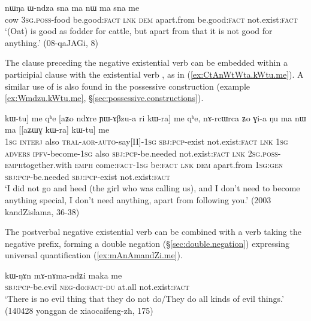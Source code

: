 \begin{exe}
\ex \label{ex:sna.me} 
\gll nɯŋa ɯ-ndza sna ma nɯ ma sna me \\
cow \textsc{3sg}.\textsc{poss}-food be.good:\textsc{fact} \textsc{lnk} \textsc{dem} apart.from be.good:\textsc{fact} not.exist:\textsc{fact} \\
\glt `(Oat) is good as fodder for cattle, but apart from that it is not good for anything.' (08-qaJAGi, 8)
\end{exe}

The clause preceding the negative existential verb can be embedded within a participial clause with the existential verb , as in (\ref{ex:CtAnWtWta.kWtu.me}). A similar use of  is also found in the possessive construction (example \ref{ex:Wmdzu.kWtu.me}, §\ref{sec:possessive.constructions}).

\begin{exe}
\ex \label{ex:CtAnWtWta.kWtu.me} 
\gll [[aʑo joβ tɕi ɕ-tɤ-nɯ-tɯt-a] kɯ-tu] me qʰe  [aʑo ndɤre ɲɯ-ɤβzu-a ri kɯ-ra] me qʰe, nɤ-rcɯ\redp{}rca ʑo ɣi-a ŋu ma nɯ ma [[aʑɯɣ kɯ-ra] kɯ-tu] me \\
\textsc{1sg} \textsc{interj} also \textsc{tral}-\textsc{aor}-\textsc{auto}-say[II]-\textsc{1sg} \textsc{sbj}:\textsc{pcp}-exist not.exist:\textsc{fact} \textsc{lnk} \textsc{1sg} \textsc{advers} \textsc{ipfv}-become-\textsc{1sg} also \textsc{sbj}:\textsc{pcp}-be.needed not.exist:\textsc{fact} \textsc{lnk} \textsc{2sg}.\textsc{poss}-\textsc{emph}\redp{}together.with \textsc{emph} come:\textsc{fact}-\textsc{1sg} be:\textsc{fact} \textsc{lnk} \textsc{dem} apart.from \textsc{1sg}:\textsc{gen} \textsc{sbj}:\textsc{pcp}-be.needed \textsc{sbj}:\textsc{pcp}-exist not.exist:\textsc{fact} \\
\glt `I did not go and heed (the girl who was calling us), and I don't need to become anything special, I don't need anything, apart from following you.' (2003 kandZislama, 36-38)
\end{exe}

The postverbal negative existential verb can be combined with a verb taking the negative prefix, forming a double negation (§\ref{sec:double.negation}) expressing universal quantification (\ref{ex:mAnAmandZi.me}).

\begin{exe}
\ex \label{ex:mAnAmandZi.me}
\gll kɯ-ŋɤn mɤ-nɤma-ndʑi maka me\\
\textsc{sbj}:\textsc{pcp}-be.evil \textsc{neg}-do:\textsc{fact}-\textsc{du} at.all not.exist:\textsc{fact}   \\
\glt `There is no evil thing that they do not do/They do all kinds of evil things.' (140428 yonggan de xiaocaifeng-zh, 175)
 \end{exe}

